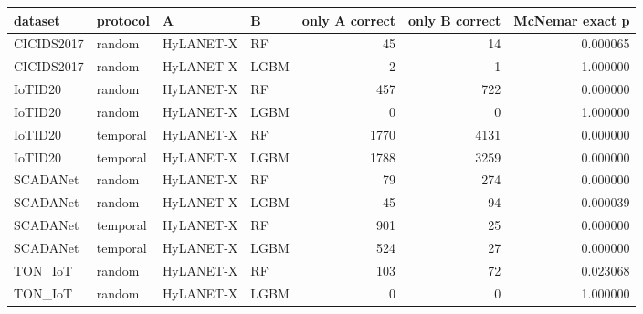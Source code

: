 \begin{tabular}{llllrrr}
\toprule
dataset & protocol & A & B & only A correct & only B correct & McNemar exact p \\
\midrule
CICIDS2017 & random & HyLANET-X & RF & 45 & 14 & 0.000065 \\
CICIDS2017 & random & HyLANET-X & LGBM & 2 & 1 & 1.000000 \\
IoTID20 & random & HyLANET-X & RF & 457 & 722 & 0.000000 \\
IoTID20 & random & HyLANET-X & LGBM & 0 & 0 & 1.000000 \\
IoTID20 & temporal & HyLANET-X & RF & 1770 & 4131 & 0.000000 \\
IoTID20 & temporal & HyLANET-X & LGBM & 1788 & 3259 & 0.000000 \\
SCADANet & random & HyLANET-X & RF & 79 & 274 & 0.000000 \\
SCADANet & random & HyLANET-X & LGBM & 45 & 94 & 0.000039 \\
SCADANet & temporal & HyLANET-X & RF & 901 & 25 & 0.000000 \\
SCADANet & temporal & HyLANET-X & LGBM & 524 & 27 & 0.000000 \\
TON\_IoT & random & HyLANET-X & RF & 103 & 72 & 0.023068 \\
TON\_IoT & random & HyLANET-X & LGBM & 0 & 0 & 1.000000 \\
\bottomrule
\end{tabular}
